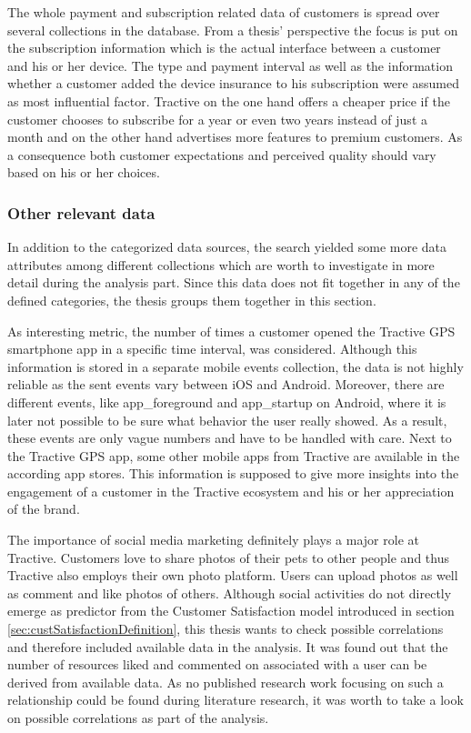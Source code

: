 The whole payment and subscription related data of customers is spread over several collections in the database. From a thesis' perspective the focus is put on the subscription information which is the actual interface between a customer and his or her device. The type and payment interval as well as the information whether a customer added the device insurance to his subscription were assumed as most influential factor. Tractive on the one hand offers a cheaper price if the customer chooses to subscribe for a year or even two years instead of just a month and on the other hand advertises more features to premium customers. As a consequence both customer expectations and perceived quality should vary based on his or her choices.

\subsubsection{Other relevant data}
In addition to the categorized data sources, the search yielded some more data attributes among different collections which are worth to investigate in more detail during the analysis part. Since this data does not fit together in any of the defined categories, the thesis groups them together in this section. 

As interesting metric, the number of times a customer opened the Tractive GPS smartphone app in a specific time interval, was considered. Although this information is stored in a separate mobile events collection, the data is not highly reliable as the sent events vary between iOS and Android. Moreover, there are different events, like app\_foreground and app\_startup on Android, where it is later not possible to be sure what behavior the user really showed. As a result, these events are only vague numbers and have to be handled with care. Next to the Tractive GPS app, some other mobile apps from Tractive are available in the according app stores. This information is supposed to give more insights into the engagement of a customer in the Tractive ecosystem and his or her appreciation of the brand. 

The importance of social media marketing definitely plays a major role at Tractive. Customers love to share photos of their pets to other people and thus Tractive also employs their own photo platform. Users can upload photos as well as comment and like photos of others. Although social activities do not directly emerge as predictor from the Customer Satisfaction model introduced in section \ref{sec:custSatisfactionDefinition}, this thesis wants to check possible correlations and therefore included available data in the analysis. It was found out that the number of resources liked and commented on associated with a user can be derived from available data. As no published research work focusing on such a relationship could be found during literature research, it was worth to take a look on possible correlations as part of the analysis. 

